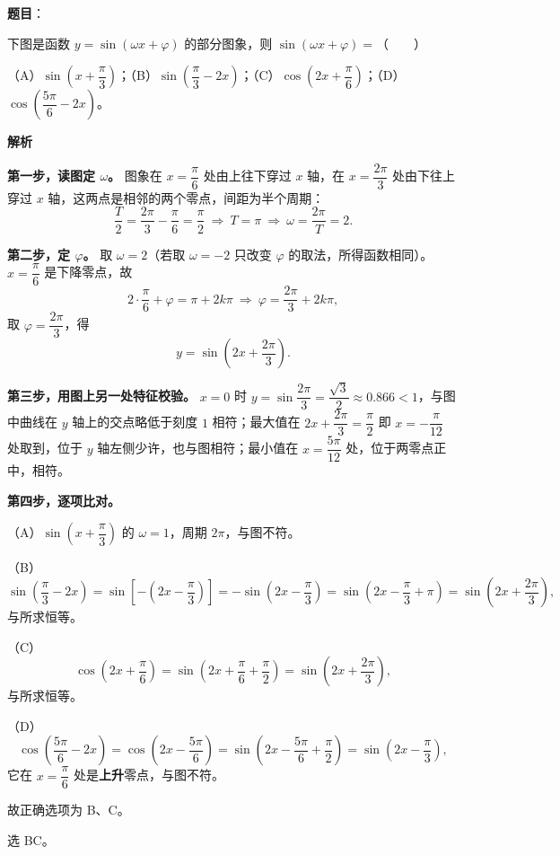 \begin{answer}

\textbf{题目}：

下图是函数 $y=\sin(\omega x+\varphi)$ 的部分图象，则 $\sin(\omega x+\varphi)=$\mbox{（　　）}
\nopagebreak[4]
\begin{center}\end{center}
\nopagebreak[4]
（A）$\sin\left(x+\dfrac\pi3\right)$；（B）$\sin\left(\dfrac\pi3-2x\right)$；（C）$\cos\left(2x+\dfrac\pi6\right)$；（D）$\cos\left(\dfrac{5\pi}6-2x\right)$。

\textbf{解析}

\textbf{第一步，读图定 $\omega$。} 图象在 $x=\dfrac\pi6$ 处由上往下穿过 $x$ 轴，在 $x=\dfrac{2\pi}3$ 处由下往上穿过 $x$ 轴，这两点是相邻的两个零点，间距为半个周期：
\nopagebreak[4]
\[\frac T2=\frac{2\pi}3-\frac\pi6=\frac\pi2\ \Longrightarrow\ T=\pi\ \Longrightarrow\ \omega=\frac{2\pi}T=2 .\]

\textbf{第二步，定 $\varphi$。} 取 $\omega=2$（若取 $\omega=-2$ 只改变 $\varphi$ 的取法，所得函数相同）。$x=\dfrac\pi6$ 是下降零点，故
\nopagebreak[4]
\[2\cdot\frac\pi6+\varphi=\pi+2k\pi\ \Longrightarrow\ \varphi=\frac{2\pi}3+2k\pi,\]
取 $\varphi=\dfrac{2\pi}3$，得
\nopagebreak[4]
\[y=\sin\left(2x+\frac{2\pi}3\right).\]

\textbf{第三步，用图上另一处特征校验。} $x=0$ 时 $y=\sin\dfrac{2\pi}3=\dfrac{\sqrt3}2\approx0.866<1$，与图中曲线在 $y$ 轴上的交点略低于刻度 $1$ 相符；最大值在 $2x+\dfrac{2\pi}3=\dfrac\pi2$ 即 $x=-\dfrac\pi{12}$ 处取到，位于 $y$ 轴左侧少许，也与图相符；最小值在 $x=\dfrac{5\pi}{12}$ 处，位于两零点正中，相符。

\textbf{第四步，逐项比对。}

（A）$\sin\left(x+\dfrac\pi3\right)$ 的 $\omega=1$，周期 $2\pi$，与图不符。

（B）
\nopagebreak[4]
\[\sin\left(\frac\pi3-2x\right)=\sin\left[-\left(2x-\frac\pi3\right)\right]=-\sin\left(2x-\frac\pi3\right)=\sin\left(2x-\frac\pi3+\pi\right)=\sin\left(2x+\frac{2\pi}3\right),\]
与所求恒等。

（C）
\nopagebreak[4]
\[\cos\left(2x+\frac\pi6\right)=\sin\left(2x+\frac\pi6+\frac\pi2\right)=\sin\left(2x+\frac{2\pi}3\right),\]
与所求恒等。

（D）
\nopagebreak[4]
\[\cos\left(\frac{5\pi}6-2x\right)=\cos\left(2x-\frac{5\pi}6\right)=\sin\left(2x-\frac{5\pi}6+\frac\pi2\right)=\sin\left(2x-\frac\pi3\right),\]
它在 $x=\dfrac\pi6$ 处是\textbf{上升}零点，与图不符。

故正确选项为 B、C。

选 BC。


\end{answer}
